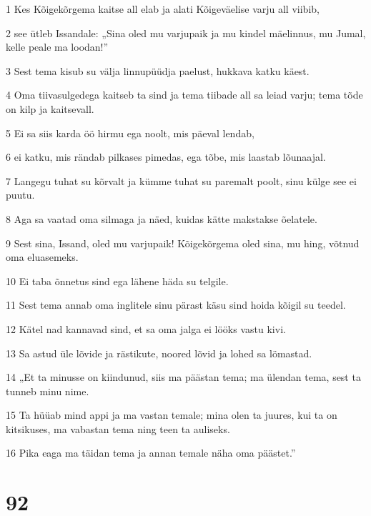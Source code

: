 \par 1 Kes Kõigekõrgema kaitse all elab ja alati Kõigeväelise varju all viibib,
\par 2 see ütleb Issandale: „Sina oled mu varjupaik ja mu kindel mäelinnus, mu Jumal, kelle peale ma loodan!”
\par 3 Sest tema kisub su välja linnupüüdja paelust, hukkava katku käest.
\par 4 Oma tiivasulgedega kaitseb ta sind ja tema tiibade all sa leiad varju; tema tõde on kilp ja kaitsevall.
\par 5 Ei sa siis karda öö hirmu ega noolt, mis päeval lendab,
\par 6 ei katku, mis rändab pilkases pimedas, ega tõbe, mis laastab lõunaajal.
\par 7 Langegu tuhat su kõrvalt ja kümme tuhat su paremalt poolt, sinu külge see ei puutu.
\par 8 Aga sa vaatad oma silmaga ja näed, kuidas kätte makstakse õelatele.
\par 9 Sest sina, Issand, oled mu varjupaik! Kõigekõrgema oled sina, mu hing, võtnud oma eluasemeks.
\par 10 Ei taba õnnetus sind ega lähene häda su telgile.
\par 11 Sest tema annab oma inglitele sinu pärast käsu sind hoida kõigil su teedel.
\par 12 Kätel nad kannavad sind, et sa oma jalga ei lööks vastu kivi.
\par 13 Sa astud üle lõvide ja rästikute, noored lõvid ja lohed sa lömastad.
\par 14 „Et ta minusse on kiindunud, siis ma päästan tema; ma ülendan tema, sest ta tunneb minu nime.
\par 15 Ta hüüab mind appi ja ma vastan temale; mina olen ta juures, kui ta on kitsikuses, ma vabastan tema ning teen ta auliseks.
\par 16 Pika eaga ma täidan tema ja annan temale näha oma päästet.”

\chapter{92}

